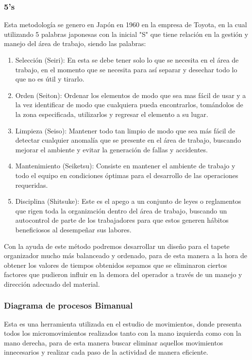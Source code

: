      \subsubsection{5's}

     Esta metodología se genero en Japón en 1960 en la empresa de Toyota, en la cual utilizando 5 palabras japonesas con la inicial "S" que tiene relación en la gestión y manejo del área de trabajo, siendo las palabras\cite{5S}:

     \begin{enumerate}
         \item Selección (Seiri): En esta se debe tener solo lo que se necesita en el área de trabajo, en el momento que se necesita para así separar y desechar todo lo que no es útil y tirarlo.
         \item Orden (Seiton): Ordenar los elementos de modo que sea mas fácil de usar y a la vez identificar de modo que cualquiera pueda encontrarlos, tomándolos de la zona especificada, utilizarlos y regresar el elemento a su lugar.
         \item Limpieza (Seiso): Mantener todo tan limpio de modo que sea más fácil de detectar cualquier anomalía que se presente en el área de trabajo, buscando mejorar el ambiente y evitar la generación de fallas y accidentes.
         \item Mantenimiento (Seiketsu): Consiste en mantener el ambiente de trabajo y todo el equipo en condiciones óptimas para el desarrollo de las operaciones requeridas.
         \item Disciplina (Shitsuke): Este es el apego a un conjunto de leyes o reglamentos que rigen toda la organización dentro del área de trabajo, buscando un autocontrol de parte de los trabajadores para que estos generen hábitos beneficiosos al desempeñar sus labores.
     \end{enumerate}

     Con la ayuda de este método podremos desarrollar un diseño para el tapete organizador mucho más balanceado y ordenado, para de esta manera a la hora de obtener los valores de tiempos obtenidos sepamos que se eliminaron ciertos factores que pudieron influir en la demora del operador a través de un manejo y dirección adecuado del material.

\subsubsection{Diagrama de procesos Bimanual}
Esta es una herramienta utilizada en el estudio de movimientos, donde presenta todos los micromovimientos realizados tanto con la mano izquierda como con la mano derecha, para de esta manera buscar eliminar aquellos movimientos innecesarios y realizar cada paso de la actividad de manera eficiente.\cite{EstTrabajo}

